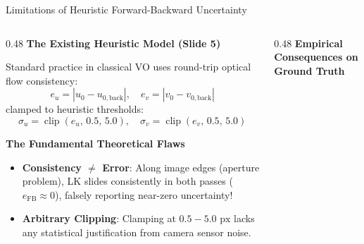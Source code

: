 \documentclass[aspectratio=169, 10pt]{beamer}
\begin{document}
\begin{frame}{Limitations of Heuristic Forward-Backward Uncertainty}
  \begin{columns}[T]
    \begin{column}{0.48\textwidth}
      {\normalsize \textbf{\textcolor{NavyBlue}{The Existing Heuristic Model (Slide 5)}}}
      \vspace{0.15cm}

      Standard practice in classical VO uses round-trip optical flow consistency:
      \begin{equation}
        e_u = |u_0 - u_{0,\text{back}}|, \quad e_v = |v_0 - v_{0,\text{back}}|
      \end{equation}
      clamped to heuristic thresholds:
      \begin{equation}
        \sigma_u = \operatorname{clip}(e_u, \, 0.5, \, 5.0), \quad \sigma_v = \operatorname{clip}(e_v, \, 0.5, \, 5.0)
      \end{equation}
      \vspace{0.1cm}

      {\small \textbf{\textcolor{NavyBlue}{The Fundamental Theoretical Flaws}}}
      \begin{itemize}
        \setlength{\itemsep}{3pt}
        \item \textbf{Consistency $\ne$ Error}: Along image edges (aperture problem), LK slides consistently in both passes ($e_{\text{FB}} \approx 0$), falsely reporting near-zero uncertainty!
        \item \textbf{Arbitrary Clipping}: Clamping at $0.5 - 5.0\text{ px}$ lacks any statistical justification from camera sensor noise.
      \end{itemize}
    \end{column}

    \begin{column}{0.48\textwidth}
      {\normalsize \textbf{\textcolor{NavyBlue}{Empirical Consequences on Ground Truth}}}
      \vspace{0.15cm}


\end{column}
\end{columns}
\end{frame}
\end{document}
